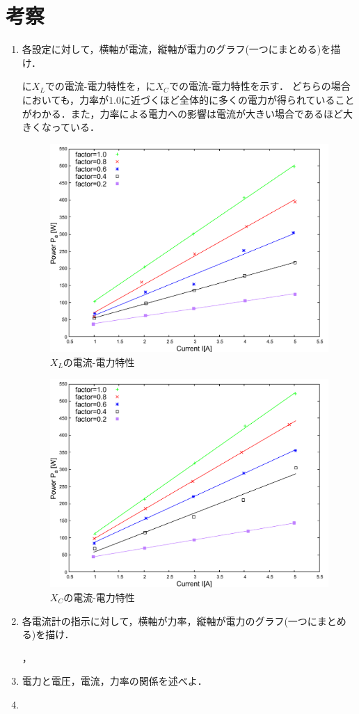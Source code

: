 \clearpage
\section{考察}
\begin{enumerate}[1.)]
	\item 各設定に対して，横軸が電流，縦軸が電力のグラフ(一つにまとめる)を描け．
	
	に$X_{L}$での電流-電力特性を，に$X_{C}$での電流-電力特性を示す．
	どちらの場合においても，力率が$1.0$に近づくほど全体的に多くの電力が得られていることがわかる．また，力率による電力への影響は電流が大きい場合であるほど大きくなっている．
	\begin{figure}[h]
	\centering
	\includegraphics[scale=0.6]{./data/L/L.pdf}
	\caption{$X_L$の電流-電力特性}
	\label{fig:L}
	\end{figure}
	\begin{figure}[h]
	\centering
	\includegraphics[scale=0.6]{./data/C/C.pdf}
	\caption{$X_C$の電流-電力特性}
	\label{fig:C}
	\end{figure}
	\item 各電流計の指示に対して，横軸が力率，縦軸が電力のグラフ(一つにまとめる)を描け．
	
	\wfig{}，\wfig{}
	\item 電力と電圧，電流，力率の関係を述べよ．
	\item 
\end{enumerate}